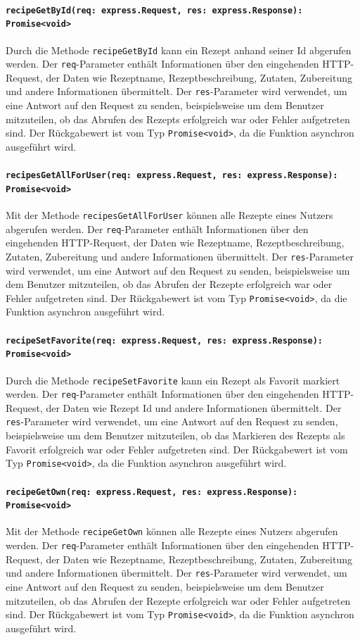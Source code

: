 \documentclass{entwurfsheft}
\begin{document}
\paragraph{\texttt{recipeGetById(req: express.Request, res: express.Response): Promise<void>}}
Durch die Methode \texttt{recipeGetById} kann ein Rezept anhand seiner Id abgerufen werden. Der \texttt{req}-Parameter enthält Informationen über den eingehenden HTTP-Request, der Daten wie Rezeptname, Rezeptbeschreibung, Zutaten, Zubereitung und andere Informationen übermittelt. Der \texttt{res}-Parameter wird verwendet, um eine Antwort auf den Request zu senden, beispielsweise um dem Benutzer mitzuteilen, ob das Abrufen des Rezepts erfolgreich war oder Fehler aufgetreten sind.
Der Rückgabewert ist vom Typ \texttt{Promise<void>}, da die Funktion asynchron ausgeführt wird.
\paragraph{\texttt{recipesGetAllForUser(req: express.Request, res: express.Response): Promise<void>}}
Mit der Methode \texttt{recipesGetAllForUser} können alle Rezepte eines Nutzers abgerufen werden. Der \texttt{req}-Parameter enthält Informationen über den eingehenden HTTP-Request, der Daten wie Rezeptname, Rezeptbeschreibung, Zutaten, Zubereitung und andere Informationen übermittelt. Der \texttt{res}-Parameter wird verwendet, um eine Antwort auf den Request zu senden, beispielsweise um dem Benutzer mitzuteilen, ob das Abrufen der Rezepte erfolgreich war oder Fehler aufgetreten sind.
Der Rückgabewert ist vom Typ \texttt{Promise<void>}, da die Funktion asynchron ausgeführt wird.
\paragraph{\texttt{recipeSetFavorite(req: express.Request, res: express.Response): Promise<void>}}
Durch die Methode \texttt{recipeSetFavorite} kann ein Rezept als Favorit markiert werden. Der \texttt{req}-Parameter enthält Informationen über den eingehenden HTTP-Request, der Daten wie Rezept Id und andere Informationen übermittelt. Der \texttt{res}-Parameter wird verwendet, um eine Antwort auf den Request zu senden, beispielsweise um dem Benutzer mitzuteilen, ob das Markieren des Rezepts als Favorit erfolgreich war oder Fehler aufgetreten sind.
Der Rückgabewert ist vom Typ \texttt{Promise<void>}, da die Funktion asynchron ausgeführt wird.
\paragraph{\texttt{recipeGetOwn(req: express.Request, res: express.Response): Promise<void>}}
Mit der Methode \texttt{recipeGetOwn} können alle Rezepte eines Nutzers abgerufen werden. Der \texttt{req}-Parameter enthält Informationen über den eingehenden HTTP-Request, der Daten wie Rezeptname, Rezeptbeschreibung, Zutaten, Zubereitung und andere Informationen übermittelt. Der \texttt{res}-Parameter wird verwendet, um eine Antwort auf den Request zu senden, beispielsweise um dem Benutzer mitzuteilen, ob das Abrufen der Rezepte erfolgreich war oder Fehler aufgetreten sind.
Der Rückgabewert ist vom Typ \texttt{Promise<void>}, da die Funktion asynchron ausgeführt wird.
\end{document}
